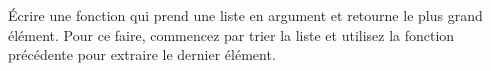 
\begin{exercice}\label{exoPremiere-0039}

    Écrire une fonction qui prend une liste en argument et retourne le plus grand élément. Pour ce faire, commencez par trier la liste et utilisez la fonction précédente pour extraire le dernier élément.


\end{exercice}

